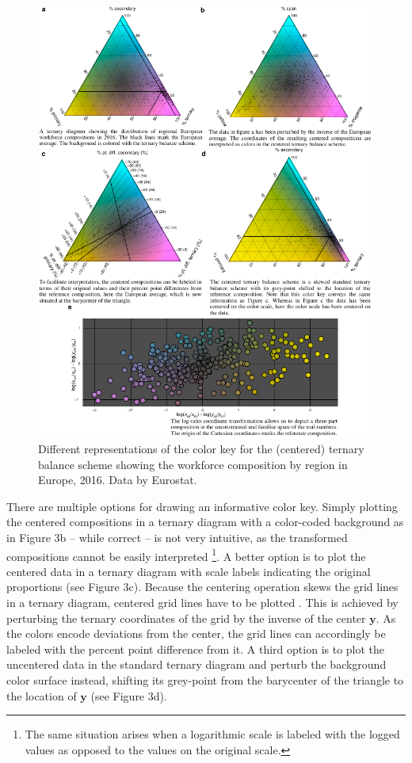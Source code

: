 \documentclass[10pt,twoside,reqno]{article}
\makeatletter
\def\cnstmaxfigwidth{
      \ifdim \Gin@nat@width>\linewidth
        \linewidth
      \else \Gin@nat@width
      \fi
    }
\let\Oldincludegraphics\includegraphics
\renewcommand{\includegraphics}[1]{\Oldincludegraphics[width=\cnstmaxfigwidth]{#1}}
\let\oldfootnote\footnote
\renewcommand\footnote[1]{%
\oldfootnote{\hspace{0.6mm}#1}}
\makeatother
\begin{document}
\begin{figure}
\centering
\includegraphics{figure3.pdf}
\caption{Different representations of the color key for the (centered)
ternary balance scheme showing the workforce composition by region in
Europe, 2016. Data by Eurostat.}
\end{figure}

There are multiple options for drawing an informative color key. Simply
plotting the centered compositions in a ternary diagram with a
color-coded background as in Figure 3b -- while correct -- is not very
intuitive, as the transformed compositions cannot be easily
interpreted\footnote{The same situation arises when a logarithmic scale
  is labeled with the logged values as opposed to the values on the
  original scale.}. A better option is to plot the centered data in a
ternary diagram with scale labels indicating the original proportions
(see Figure 3c). Because the centering operation skews the grid lines in
a ternary diagram, centered grid lines have to be plotted
\citep{VonEynatten2002}. This is achieved by perturbing the ternary
coordinates of the grid by the inverse of the center \(\mathbf{y}\). As
the colors encode deviations from the center, the grid lines can
accordingly be labeled with the percent point difference from it. A
third option is to plot the uncentered data in the standard ternary
diagram and perturb the background color surface instead, shifting its
grey-point from the barycenter of the triangle to the location of
\(\mathbf{y}\) (see Figure 3d).
\end{document}

